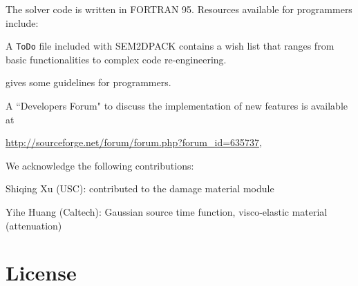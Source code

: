 The solver code is written in FORTRAN 95.
Resources available for programmers include:
\begin{sitemize}
  \item A \texttt{ToDo} file included with SEM2DPACK
contains a wish list that ranges from basic functionalities to complex code re-engineering.
  \item {} gives some guidelines for programmers.
  \item A ``Developers Forum" to discuss the implementation of new features is available at \\
\centerline{\url{http://sourceforge.net/forum/forum.php?forum_id=635737},}
\end{sitemize}

We acknowledge the following contributions:
\begin{sitemize}
  \item Shiqing Xu (USC): contributed to the damage material module
  \item Yihe Huang (Caltech): Gaussian source time function, visco-elastic material (attenuation)
\end{sitemize}

\section{License}

